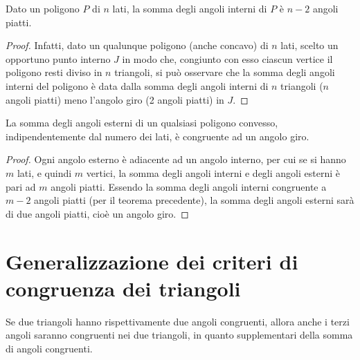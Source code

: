 \begin{teorema}
Dato un poligono $P$ di $n$ lati, la somma degli angoli interni di $P$ è $n-2$ angoli piatti.
\end{teorema}
\noindent \begin{minipage}{0.5\textwidth}
\begin{proof}
Infatti, dato un qualunque poligono (anche concavo) di $n$ lati, scelto un opportuno punto interno $J$ in modo che, congiunto con esso ciascun vertice il poligono resti diviso in $n$ triangoli, si può osservare che la somma degli angoli interni del poligono è data dalla somma degli angoli interni di $n$ triangoli ($n$ angoli piatti) meno l'angolo giro (2 angoli piatti) in $J$.
\end{proof}
\end{minipage}\hfil
\begin{minipage}{0.5\textwidth}
\centering
\end{minipage}

\begin{teorema}
La somma degli angoli esterni di un qualsiasi poligono convesso, indipendentemente dal numero dei lati, è congruente ad un angolo giro.
\end{teorema}
\noindent \begin{minipage}{0.5\textwidth}
\begin{proof}
Ogni angolo esterno è adiacente ad un angolo interno, per cui se si hanno $m$ lati, e quindi $m$ vertici, la somma degli angoli interni e degli angoli esterni è pari ad $m$ angoli piatti. Essendo la somma degli angoli interni congruente a $m-2$ angoli piatti (per il teorema precedente), la somma degli angoli esterni sarà di due angoli piatti, cioè un angolo giro.
\end{proof}
\end{minipage}\hfil
\begin{minipage}{0.5\textwidth}
\centering
\end{minipage}


\section{Generalizzazione dei criteri di congruenza dei triangoli}\label{sect:generalizzazione_criteri_congruenza_triangoli}

Se due triangoli hanno rispettivamente due angoli congruenti, allora anche i terzi angoli saranno congruenti nei due triangoli, in quanto supplementari della somma di angoli congruenti.

